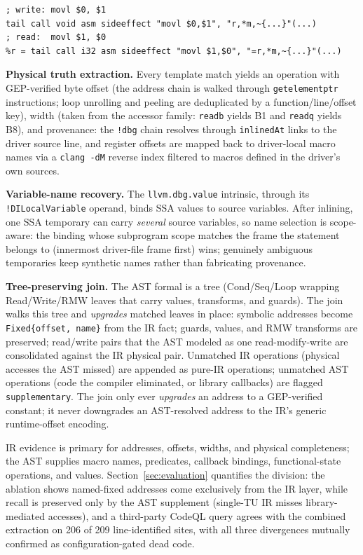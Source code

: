 \begin{lstlisting}
; write: movl $0, $1
tail call void asm sideeffect "movl $0,$1", "r,*m,~{...}"(...)
; read:  movl $1, $0
%r = tail call i32 asm sideeffect "movl $1,$0", "=r,*m,~{...}"(...)
\end{lstlisting}

\textbf{Physical truth extraction.} Every template match yields an
operation with GEP-verified byte offset (the address chain is walked
through \texttt{getelementptr} instructions; loop unrolling and peeling are
deduplicated by a function/line/offset key), width (taken from the
accessor family: \texttt{readb} yields B1 and \texttt{readq} yields B8),
and provenance: the \texttt{!dbg} chain resolves through
\texttt{inlinedAt} links to the driver source line, and register offsets are
mapped back to driver-local macro names via a \texttt{clang -dM} reverse
index filtered to macros defined in the driver's own sources.

\textbf{Variable-name recovery.} The \texttt{llvm.dbg.value} intrinsic,
through its \texttt{!DILocalVariable} operand, binds SSA values to source
variables. After inlining, one SSA temporary can carry
\emph{several} source variables, so name selection is scope-aware: the
binding whose subprogram scope matches the frame the statement belongs to
(innermost driver-file frame first) wins; genuinely ambiguous temporaries
keep synthetic names rather than fabricating provenance.

\textbf{Tree-preserving join.} The AST formal is a tree (Cond/Seq/Loop
wrapping Read/Write/RMW leaves that carry values, transforms, and guards).
The join walks this tree and \emph{upgrades} matched leaves in place:
symbolic addresses become \texttt{Fixed\{offset, name\}} from the IR fact;
guards, values, and RMW transforms are preserved; read/write pairs that the
AST modeled as one read-modify-write are consolidated against the IR
physical pair. Unmatched IR operations (physical accesses the AST missed)
are appended as pure-IR operations; unmatched AST operations (code the
compiler eliminated, or library callbacks) are flagged
\texttt{supplementary}. The join only ever \emph{upgrades} an address to a
GEP-verified constant; it never downgrades an AST-resolved address to the
IR's generic runtime-offset encoding.

IR evidence is primary for addresses, offsets, widths, and physical
completeness; the AST supplies macro names, predicates, callback bindings,
functional-state operations, and values. Section~\ref{sec:evaluation}
quantifies the division: the ablation shows named-fixed addresses come
exclusively from the IR layer, while recall is preserved only by the AST
supplement (single-TU IR misses library-mediated accesses), and a
third-party CodeQL query agrees with the combined extraction on 206 of 209
line-identified sites, with all three divergences mutually confirmed as
configuration-gated dead code.


